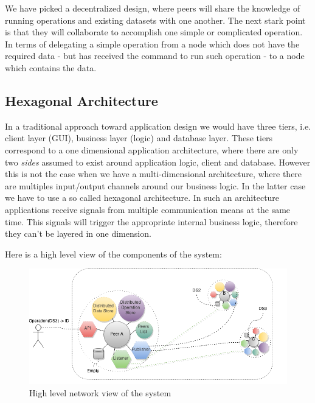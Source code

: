 We have picked a decentralized design, where peers will share the knowledge of running operations and existing datasets
with one another. The next stark point is that they will collaborate to accomplish one simple or complicated operation.
In terms of delegating a simple operation from a node which does not have the required data - but has received the command
to run such operation - to a node which contains the data.

\subsection{Hexagonal Architecture}
In a traditional approach toward application design we would have three tiers, i.e. client layer (GUI),
business layer (logic) and database layer. These tiers correspond to a one dimensional application architecture,
where there are only two \textit{sides} assumed to exist around application logic, client and database. However
this is not the case when we have a multi-dimensional architecture, where there are multiples input/output channels
around our business logic. In the latter case we have to use a so called hexagonal architecture. \cite{alistair}
In such an architecture applications receive signals from multiple communication means at the same time. This 
signals will trigger the appropriate internal business logic, therefore they can't be layered in one dimension.

Here is a high level view of the components of the system:

\begin{figure}[h]
  \centering
  \includegraphics[width=6in]{poster/figures/sys2.png}
  \caption[High level view of a network of collaborative peers]
   {High level network view of the system}
\end{figure}


